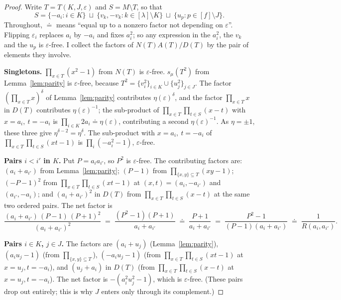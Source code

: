 \documentclass[11pt]{article}
\theoremstyle{definition}
\theoremstyle{remark}
\begin{document}
\begin{proof}
Write $T=T(K,J,\varepsilon)$ and $S=M\setminus T$, so that
\[
  S=\{-a_i:i\in K\}\ \sqcup\ \{v_k,-v_k:k\in[\lambda]\setminus K\}
      \ \sqcup\ \{u_p:p\in[f]\setminus J\}.
\]
Throughout, $\doteq$ means ``equal up to a nonzero factor not depending on
$\varepsilon$''. Flipping $\varepsilon_i$ replaces $a_i$ by $-a_i$ and fixes $a_i^2$;
so any expression in the $a_i^2$, the $v_k$ and the $u_p$ is $\varepsilon$-free.
I collect the factors of $N(T)A(T)/D(T)$ by the pair of elements they involve.

\smallskip\noindent\textbf{Singletons.} $\prod_{x\in T}(x^2-1)$ from $N(T)$ is
$\varepsilon$-free. $s_\mu(T^2)$ from Lemma~\ref{lem:parity} is $\varepsilon$-free,
because $T^2=\{v_i^2\}_{i\in K}\cup\{u_j^2\}_{j\in J}$. The factor
$(\prod_{x\in T}x)^{\delta}$ of Lemma~\ref{lem:parity} contributes
$\eta(\varepsilon)^{\delta}$, and the factor $\prod_{x\in T}x$ in $D(T)$ contributes
$\eta(\varepsilon)^{-1}$; the sub-product of $\prod_{x\in T}\prod_{t\in S}(x-t)$ with
$x=a_i,\ t=-a_i$ is $\prod_{i\in K}2a_i\doteq\eta(\varepsilon)$, contributing a second
$\eta(\varepsilon)^{-1}$. As $\eta=\pm1$, these three give
$\eta^{\delta-2}=\eta^{\delta}$. The sub-product with $x=a_i,\ t=-a_i$ of
$\prod_{x\in T}\prod_{t\in S}(xt-1)$ is $\prod_i(-a_i^2-1)$, $\varepsilon$-free.

\smallskip\noindent\textbf{Pairs $i<i'$ in $K$.} Put $P=a_ia_{i'}$, so $P^2$ is
$\varepsilon$-free. The contributing factors are: $(a_i+a_{i'})$ from
Lemma~\ref{lem:parity}; $(P-1)$ from $\prod_{\{x,y\}\subseteq T}(xy-1)$;
$(-P-1)^2$ from $\prod_{x\in T}\prod_{t\in S}(xt-1)$ at $(x,t)=(a_i,-a_{i'})$ and
$(a_{i'},-a_i)$; and $(a_i+a_{i'})^2$ in $D(T)$ from
$\prod_{x\in T}\prod_{t\in S}(x-t)$ at the same two ordered pairs. The net factor is
\[
  \frac{(a_i+a_{i'})\,(P-1)\,(P+1)^2}{(a_i+a_{i'})^{2}}
  \;=\;\frac{(P^2-1)(P+1)}{a_i+a_{i'}}
  \;\doteq\;\frac{P+1}{a_i+a_{i'}}
  \;=\;\frac{P^2-1}{(P-1)(a_i+a_{i'})}
  \;\doteq\;\frac{1}{R(a_i,a_{i'})}.
\]

\smallskip\noindent\textbf{Pairs $i\in K$, $j\in J$.} The factors are $(a_i+u_j)$
(Lemma~\ref{lem:parity}), $(a_iu_j-1)$ (from $\prod_{\{x,y\}\subseteq T}$),
$(-a_iu_j-1)$ (from $\prod_{x\in T}\prod_{t\in S}(xt-1)$ at $x=u_j,t=-a_i$), and
$(u_j+a_i)$ in $D(T)$ (from $\prod_{x\in T}\prod_{t\in S}(x-t)$ at $x=u_j,t=-a_i$). The
net factor is $-(a_i^2u_j^2-1)$, which is $\varepsilon$-free. (These pairs drop out
entirely; this is why $J$ enters only through its complement.)


\end{proof}
\end{document}
